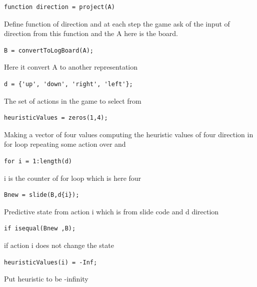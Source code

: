\documentclass{article}
\begin{document}
\begin{tcolorbox}
\begin{verbatim}
function direction = project(A)
\end{verbatim}
\end{tcolorbox}
Define function of direction and at each step the game ask of the input of direction from this function and the A here is the board.

\begin{tcolorbox}
\begin{verbatim}
B = convertToLogBoard(A);
\end{verbatim}
\end{tcolorbox}
Here it convert A to another representation

\begin{tcolorbox}
\begin{verbatim}
d = {'up', 'down', 'right', 'left'};
\end{verbatim}
\end{tcolorbox}
The set of actions in the game to select from

\begin{tcolorbox}
\begin{verbatim}
heuristicValues = zeros(1,4);
\end{verbatim}
\end{tcolorbox}
Making a vector of four values computing the heuristic values of four direction in for loop repeating some action over and

\begin{tcolorbox}
\begin{verbatim}
for i = 1:length(d)
\end{verbatim}
\end{tcolorbox}
i is the counter of for loop which is here four

\begin{tcolorbox}
\begin{verbatim}
Bnew = slide(B,d{i});
\end{verbatim}
\end{tcolorbox}
Predictive state from action i which is from slide code and d direction

\begin{tcolorbox}
\begin{verbatim}
if isequal(Bnew ,B);
\end{verbatim}
\end{tcolorbox}
if action i does not change the state    

\begin{tcolorbox}
\begin{verbatim}
heuristicValues(i) = -Inf;
\end{verbatim}
\end{tcolorbox}
Put heuristic to be -infinity
\end{document}
